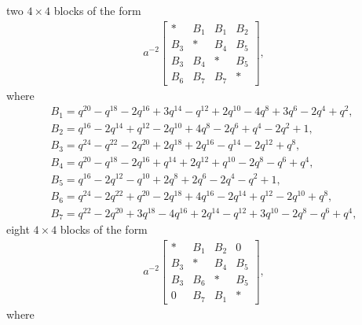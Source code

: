 \documentclass[pdftex]{sigma}
\numberwithin{equation}{section}
\theoremstyle{definition}
\newcommand{\flac}[2]{#1}
\begin{document}
two $4 \times 4$ blocks of the form
\begin{align*}
 a^{-2}\begin{bmatrix}
 * & B_1 & B_1 & B_2 \\
 B_3 & * & B_4 & B_5 \\
 B_3 & B_4 & * & B_5 \\
 B_6 & B_7 & B_7 & *
 \end{bmatrix},
\end{align*}
where
\begin{gather*}
 B_1 = \flac{q^{20}}{a^2}-\flac{q^{18}}{a^2}-\flac{2q^{16}}{a^2}+\flac{3q^{14}}{a^2}-\flac{q^{12}}{a^2}+\flac{2q^{10}}{a^2}-\flac{4q^{8}}{a^2}+\flac{3q^{6}}{a^2}-\flac{2q^{4}}{a^2}+\flac{q^{2}}{a^2}, \\
 B_2 = \flac{q^{16}}{a^2}-\flac{2q^{14}}{a^2}+\flac{q^{12}}{a^2}-\flac{2q^{10}}{a^2}+\flac{4q^{8}}{a^2}-\flac{2q^{6}}{a^2}+\flac{q^{4}}{a^2}-\flac{2q^{2}}{a^2}+\flac{1}{a^2}, \\
 B_3 = \flac{q^{24}}{a^2}-\flac{q^{22}}{a^2}-\flac{2q^{20}}{a^2}+\flac{2q^{18}}{a^2}+\flac{2q^{16}}{a^2}-\flac{q^{14}}{a^2}-\flac{2q^{12}}{a^2}+\flac{q^{8}}{a^2}, \\
 B_4 = \flac{q^{20}}{a^2}-\flac{q^{18}}{a^2}-\flac{2q^{16}}{a^2}+\flac{q^{14}}{a^2}+\flac{2q^{12}}{a^2}+\flac{q^{10}}{a^2}-\flac{2q^{8}}{a^2}-\flac{q^{6}}{a^2}+\flac{q^{4}}{a^2}, \\
 B_5 = \flac{q^{16}}{a^2}-\flac{2q^{12}}{a^2}-\flac{q^{10}}{a^2}+\flac{2q^{8}}{a^2}+\flac{2q^{6}}{a^2}-\flac{2q^{4}}{a^2}-\flac{q^{2}}{a^2}+\flac{1}{a^2}, \\
 B_6 = \flac{q^{24}}{a^2}-\flac{2q^{22}}{a^2}+\flac{q^{20}}{a^2}-\flac{2q^{18}}{a^2}+\flac{4q^{16}}{a^2}-\flac{2q^{14}}{a^2}+\flac{q^{12}}{a^2}-\flac{2q^{10}}{a^2}+\flac{q^{8}}{a^2}, \\
 B_7 = \flac{q^{22}}{a^2}-\flac{2q^{20}}{a^2}+\flac{3q^{18}}{a^2}-\flac{4q^{16}}{a^2}+\flac{2q^{14}}{a^2}-\flac{q^{12}}{a^2}
 +\flac{3q^{10}}{a^2}-\flac{2q^{8}}{a^2}-\flac{q^{6}}{a^2}+\flac{q^{4}}{a^2},
\end{gather*}
eight $4 \times 4$ blocks of the form
\begin{align*}
 a^{-2} \begin{bmatrix}
 * & B_1 & B_2 & 0 \\
 B_3 & * & B_4 & B_5 \\
 B_3 & B_6 & * & B_5 \\
 0 & B_7 & B_1 & *
 \end{bmatrix},
\end{align*}
where
\end{document}
